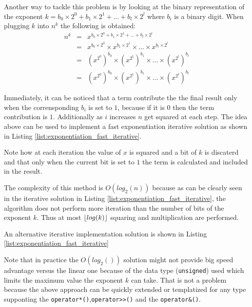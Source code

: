 Another way to tackle this problem is by looking at the binary representation of the exponent $k = b_0 \times 2^0 + b_1 \times 2^1 + \ldots + b_l \times 2^l$ where $b_i$ is a binary digit. 
When plugging $k$ into $n^k$ the following is obtained:
\[
	\begin{array}{lcl}
		n^k & = &  x^{b_0 \times 2^0 + b_1 \times 2^1 + \ldots + b_l \times 2^l} \\
		& = & x^{b_0 \times 2^0} \times x^{b_1 \times 2^1} \times \ldots \times x^{b_l \times 2^l} \\
		& = & (x^{2^0})^{b_0} \times  (x^{2^1})^{b_1} \times \ldots \times (x^{2^l})^{b_l} \\
		& = & (x^{2^0})^{b_0} \times  (x^{2^1})^{b_1} \times \ldots \times (x^{2^l})^{b_l} 
	\end{array}
\]

Immediately, it can be noticed that a term contribute the the final result only when the corrensponding $b_i$ is set to $1$, because if it is $0$ then the term contribution is $1$. Additionally as $i$ increases $n$ get squared at each step.
The idea above can be used to implement a fast exponentiation iterative solution as shown in Listing \ref{list:exponentiation_fast_iterative}.


Note how at each iteration the value of $x$ is squared and a bit of $k$ is discaterd and that only when the current bit is set to $1$ the term is calculated and included in the result. 

The complexity of this method is $O(log_2(n))$ because as can be clearly seen in the iterative solution in Listing \ref{list:exponentiation_fast_iterative}, the algorithm does not perform more iteration than the number of bits of the exponent $k$.
Thus at most $\lfloor log(k)\rfloor$ squaring and multiplication are performed.

An alternative iterative implementation solution is shown in Listing \ref{list:exponentiation_fast_iterative}


Note that in practice the $O(log_2())$  solution might not provide big speed advantage versus the linear one because of the data type (\texttt{unsigned}) used which limits the maximum value the exponent $k$ can take. That is not a problem because the above approach can be quickly extended or templatized for any type supponting the \texttt{operator*()},\texttt{operator>>()} and the \texttt{operator\&()}.

